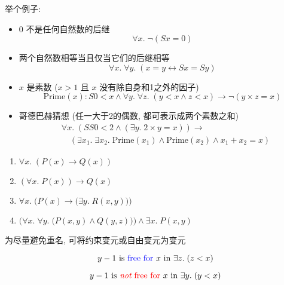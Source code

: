 举个例子: 

  \begin{itemize}
    \item 0 不是任何自然数的后继
        \[
          \forall x.\; \lnot (Sx = 0)
        \]
      \item 两个自然数相等当且仅当它们的后继相等
        \[
          \forall x.\; \forall y.\; (x = y \leftrightarrow Sx = Sy)
        \]
      \item $x$ 是素数 ($x > 1$ 且 $x$ 没有除自身和1之外的因子)
        \[
          \text{Prime}(x): S0 < x \land \forall y.\; \forall z.\; (y < x \land z < x) \to \lnot (y \times z = x)
        \]
      \item 哥德巴赫猜想 (任一大于2的偶数, 都可表示成两个素数之和)
        \begin{align*}
          &\forall x.\; (SS0 < 2 \land (\exists y.\; 2 \times y = x)) \to \\
            &\quad (\exists x_{1}.\; \exists x_{2}.\; \text{Prime}(x_{1}) \land \text{Prime}(x_{2})
              \land x_{1} + x_{2} = x)
        \end{align*}
  \end{itemize}


\begin{definition}
  \begin{enumerate}[(1)]
    \item $\forall x.\; (P(x) \to Q(x))$
    \item $(\forall x.\; P(x)) \to Q(x)$
    \item $\forall x.\; \Big(P(x) \to \big(\exists y.\; R(x, y)\big)\Big)$
    \item $\Big(\forall x.\; \forall y.\; \big(P(x, y) \land Q(y, z)\big)\Big) \land \exists x.\; P(x, y)$
  \end{enumerate}
\end{definition}

\begin{definition}[改名 (Rename)]
  为尽量避免重名, 可将约束变元或自由变元为变元
\end{definition}

\begin{definition}
  \[
    y - 1 \text{ is \textcolor{blue}{free for} } x \text{ in } \exists z.\; (z < x)
  \]

  \[
    y - 1 \text{ is \textcolor{red}{{\it not} free for} } x \text{ in } \exists y.\; (y < x)
  \]
\end{definition}

